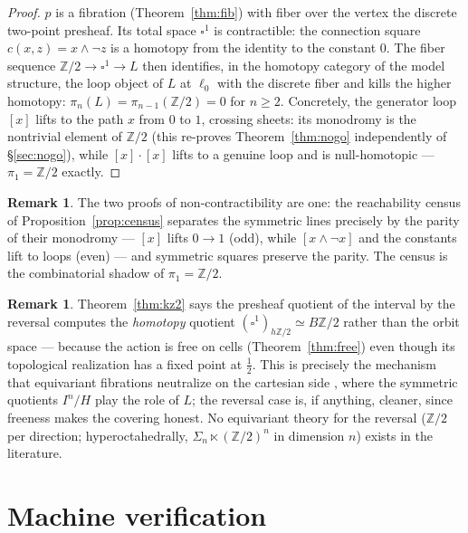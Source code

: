 \documentclass[11pt]{amsart}
\theoremstyle{definition}
\newtheorem{rem}[thm]{Remark}
\newcommand{\Ldash}{L}
\begin{document}
\begin{proof}
  $p$ is a fibration (Theorem~\ref{thm:fib}) with fiber over the
  vertex the discrete two-point presheaf.  Its total space
  $\square^1$ is contractible: the connection square
  $c(x, z) = x \wedge \neg z$ is a homotopy from the identity to
  the constant $0$.  The fiber sequence
  $\mathbb{Z}/2 \to \square^1 \to \Ldash$ then identifies, in the
  homotopy category of the model structure, the loop object of
  $\Ldash$ at $\ell_0$ with the discrete fiber and kills the
  higher homotopy: $\pi_n(\Ldash) = \pi_{n-1}(\mathbb{Z}/2) = 0$
  for $n \geq 2$.  Concretely, the generator loop $[x]$ lifts to
  the path $x$ from $0$ to $1$, crossing sheets: its monodromy is
  the nontrivial element of $\mathbb{Z}/2$ (this re-proves
  Theorem~\ref{thm:nogo} independently of \S\ref{sec:nogo}), while
  $[x] \cdot [x]$ lifts to a genuine loop and is
  null-homotopic --- $\pi_1 = \mathbb{Z}/2$ exactly.
\end{proof}

\begin{rem}
  The two proofs of non-contractibility are one: the reachability
  census of Proposition~\ref{prop:census} separates the symmetric
  lines precisely by the parity of their monodromy --- $[x]$ lifts
  $0 \to 1$ (odd), while $[x \wedge \neg x]$ and the constants lift
  to loops (even) --- and symmetric squares preserve the parity.
  The census is the combinatorial shadow of
  $\pi_1 = \mathbb{Z}/2$.
\end{rem}

\begin{rem}
  Theorem~\ref{thm:kz2} says the presheaf quotient of the interval
  by the reversal computes the \emph{homotopy} quotient
  $(\square^1)_{h\mathbb{Z}/2} \simeq B\mathbb{Z}/2$ rather than
  the orbit space --- because the action is free on cells
  (Theorem~\ref{thm:free}) even though its topological realization
  has a fixed point at $\tfrac12$.  This is precisely the mechanism
  that equivariant fibrations neutralize on the cartesian side
  \cite{ACCRS}, where the symmetric quotients $I^n/H$ play the role
  of $\Ldash$; the reversal case is, if anything, cleaner, since
  freeness makes the covering honest.  No equivariant theory for
  the reversal ($\mathbb{Z}/2$ per direction; hyperoctahedrally,
  $\Sigma_n \ltimes (\mathbb{Z}/2)^n$ in dimension $n$) exists in
  the literature.
\end{rem}

\section{Machine verification}
\label{sec:machine}
\end{document}
